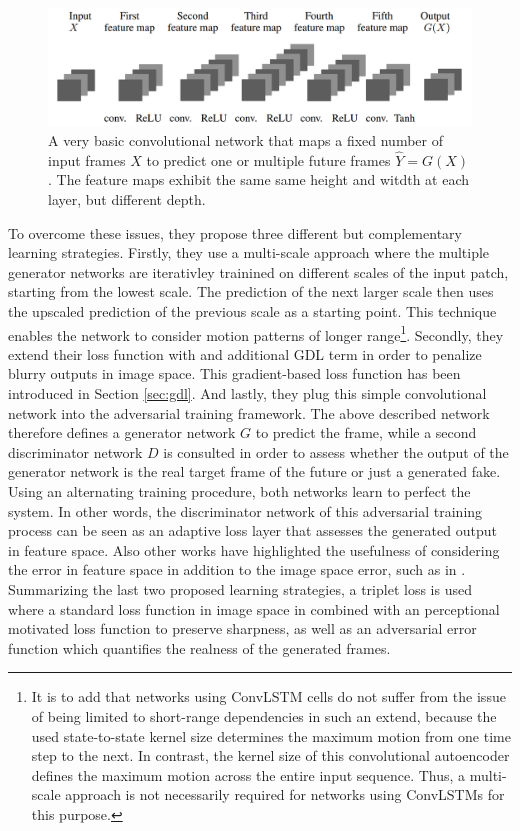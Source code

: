 \begin{figure}[htb]
	\centering
	\includegraphics[width=0.8\linewidth]{figures/related/deep_multiscale_generator.png} 
	\caption[Convolutional Autoencoder for Future Generation]{A very basic convolutional network that maps a fixed number of input frames $X$ to predict one or multiple future frames $\hat{Y} = G(X)$. The feature maps exhibit the same same height and witdth at each layer, but different depth.} \label{fig:gan_generator}
\end{figure}

To overcome these issues, they propose three different but complementary learning strategies. Firstly, they use a multi-scale approach where the multiple generator networks are iterativley trainined on different scales of the input patch, starting from the lowest scale. The prediction of the next larger scale then uses the upscaled prediction of the previous scale as a starting point. This technique enables the network to consider motion patterns of longer range\footnote{It is to add that networks using ConvLSTM cells do not suffer from the issue of being limited to short-range dependencies in such an extend, because the used state-to-state kernel size determines the maximum motion from one time step to the next. In contrast, the kernel size of this convolutional autoencoder defines the maximum motion across the entire input sequence. Thus, a multi-scale approach is not necessarily required for networks using ConvLSTMs for this purpose.}. Secondly, they extend their loss function with and additional GDL term in order to penalize blurry outputs in image space. This gradient-based loss function has been introduced in Section \ref{sec:gdl}. And lastly, they plug this simple convolutional network into the adversarial training framework. The above described network therefore defines a generator network $G$ to predict the frame, while a second discriminator network $D$ is consulted in order to assess whether the output of the generator network is the real target frame of the future or just a generated fake. Using an alternating training procedure, both networks learn to perfect the system. In other words, the discriminator network of this adversarial training process can be seen as an adaptive loss layer that assesses the generated output in feature space. Also other works have highlighted the usefulness of considering the error in feature space in addition to the image space error, such as in \parencite{gen_img_perc_sim}. Summarizing the last two proposed learning strategies, a triplet loss is used where a standard loss function in image space in combined with an perceptional motivated loss function to preserve sharpness, as well as an adversarial error function which quantifies the realness of the generated frames. 

